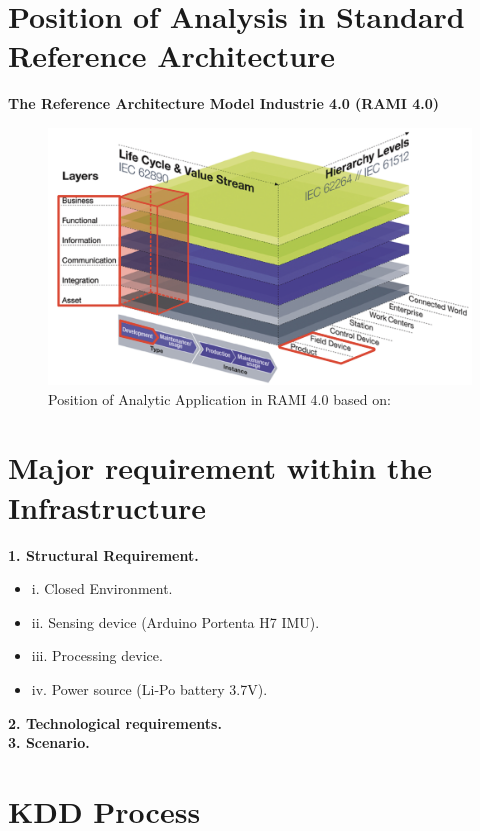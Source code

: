 \section{Position of Analysis in Standard Reference Architecture}
\STANDARD{\insertsection}
{
\textbf{The Reference Architecture Model Industrie 4.0 (RAMI 4.0)} 
\begin{figure}[ht]
    \centering
    \includegraphics[scale=0.125]{img/Position of Analytic Application in RAMI4.jpg}
    \caption{Position of Analytic Application in RAMI 4.0 based on: \cite{Hankel2015}}
    \label{fig:Position of Analytic Application in RAMI 4.0}
\end{figure}
}

\section{Major requirement within the Infrastructure}
\STANDARD{\insertsection}
{
\textbf{1. Structural Requirement.}
\begin{itemize}
    \item   i. Closed Environment.
    \item  ii. Sensing device (Arduino Portenta H7 IMU).
    \item iii. Processing device.
    \item  iv. Power source (Li-Po battery 3.7V).   
\end{itemize}
\bigskip

\textbf{2. Technological requirements.}\\
\bigskip
\textbf{3. Scenario.}
}

\section{KDD Process}
